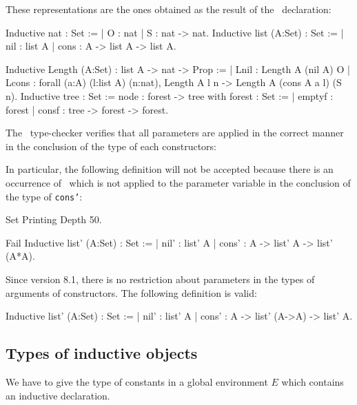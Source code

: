 These representations are the ones obtained as the result of the \Coq\ 
declaration:
\begin{coq_example*}
Inductive nat : Set :=
  | O : nat
  | S : nat -> nat.
Inductive list (A:Set) : Set :=
  | nil : list A
  | cons : A -> list A -> list A.
\end{coq_example*}
\begin{coq_example*}
Inductive Length (A:Set) : list A -> nat -> Prop :=
  | Lnil : Length A (nil A) O
  | Lcons :
      forall (a:A) (l:list A) (n:nat),
        Length A l n -> Length A (cons A a l) (S n).
Inductive tree : Set :=
    node : forest -> tree
with forest : Set :=
  | emptyf : forest
  | consf : tree -> forest -> forest.
\end{coq_example*}
The \Coq\ type-checker verifies that all
parameters are applied in the correct manner in the conclusion of the
type of each constructors:

In particular, the following definition will not be accepted because 
there is an occurrence of \List\ which is not applied to the parameter
variable in the conclusion of the type of {\tt cons'}:
\begin{coq_eval}
Set Printing Depth 50.
\end{coq_eval}
\begin{coq_example}
Fail Inductive list' (A:Set) : Set :=
  | nil' : list' A
  | cons' : A -> list' A -> list' (A*A).
\end{coq_example}
Since \Coq{} version 8.1, there is no restriction about parameters in
the types of arguments of constructors. The following definition is
valid:
\begin{coq_example}
Inductive list' (A:Set) : Set :=
  | nil' : list' A
  | cons' : A -> list' (A->A) -> list' A.
\end{coq_example}


\subsection{Types of inductive objects}
We have to give the type of constants in a global environment $E$ which
contains an inductive declaration.

